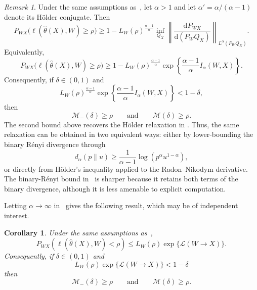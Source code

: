 \documentclass[11pt]{article}
\newtheorem{corollary}[theorem]{Corollary}
\theoremstyle{definition}
\theoremstyle{remark}
\newtheorem{remark}[theorem]{Remark}
\newcommand{\1}{\boldsymbol{1}}
\newcommand{\ml}[2]{\mathcal{L}(#1\!\to\!#2)}
\begin{document}
\begin{remark}
\label{rmk:holderLowerBound}
Under the same assumptions as~, let $\alpha>1$ and let $\alpha'=\alpha/(\alpha-1)$ denote its H\"older conjugate. Then
\begin{equation}
P_{WX}\bigl(\ell(\widehat\theta(X),W)\geq\rho\bigr)
\geq
1-
L_W(\rho)^{\frac{\alpha-1}{\alpha}}
\inf_{Q_X}
\left\|
\frac{\mathrm dP_{WX}}{\mathrm d(P_WQ_X)}
\right\|_{L^\alpha(P_WQ_X)}.
\end{equation}
Equivalently,
\begin{equation}
P_{WX}\bigl(\ell(\widehat\theta(X),W)\geq\rho\bigr)
\geq
1-
L_W(\rho)^{\frac{\alpha-1}{\alpha}}
\exp\left\{
\frac{\alpha-1}{\alpha}
I_\alpha(W,X)
\right\}.
\end{equation}
Consequently, if $\delta\in(0,1)$ and
\begin{equation}
L_W(\rho)^{\frac{\alpha-1}{\alpha}}
\exp\left\{
\frac{\alpha-1}{\alpha}
I_\alpha(W,X)
\right\}
<
1-\delta,
\end{equation}
then
\begin{equation}
\mathcal M_{-}(\delta)\geq\rho
\qquad\text{and}\qquad
\mathcal M(\delta)\geq\rho.
\end{equation}
The second bound above recovers the H\"older relaxation in
. Thus, the same relaxation can be obtained in
two equivalent ways: either by lower-bounding
the binary R\'enyi divergence through
\[
d_\alpha(p\|u)
\geq
\frac{1}{\alpha-1}\log(p^\alpha u^{1-\alpha}),
\]
or directly from H\"older's inequality applied to the Radon--Nikodym
derivative. The binary-R\'enyi bound in~ is sharper
because it retains both terms of the binary divergence, although it is less
amenable to explicit computation.
\end{remark}
Letting $\alpha\to\infty$ in~ gives the following
result, which may be of independent interest.
\begin{corollary}
    \label{cor:maximalLeakageQuantile}
    Under the same assumptions as~,
    \begin{equation}
        P_{WX}(\ell(\hat \theta(X),W)<\rho)\leq L_W(\rho) \exp\{\ml{W}{X}\}. \label{eq:maximalLeakageSuccessBound}
    \end{equation}
    Consequently, if $\delta \in (0,1)$ and 
    \begin{equation}
        L_W(\rho)\exp\{\ml{W}{X}\} < 1-\delta
    \end{equation}
    then
    \begin{equation}
\mathcal M_{-}(\delta)\geq\rho
\qquad\text{and}\qquad
\mathcal M(\delta)\geq\rho.
\end{equation}
\end{corollary}
\end{document}
